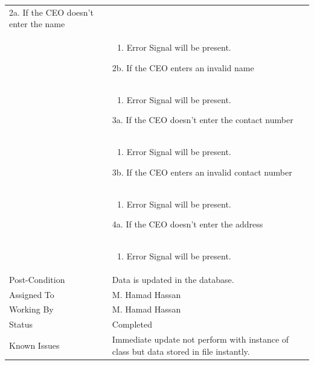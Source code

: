 \documentclass[12pt,a4paper]{article}
\begin{document}
\begin{longtable}{| p{3cm}|p{12cm}|}
2a.  If the CEO doesn't enter the name\\ 	
&	\begin{enumerate}
		\item Error Signal will be present.
	\end{enumerate}
2b. If the CEO enters an invalid name \\ 	
&	\begin{enumerate}
		\item Error Signal will be present.
	\end{enumerate}
3a.  If the CEO doesn't enter the contact number\\ 	
&	\begin{enumerate}
		\item Error Signal will be present.
	\end{enumerate}
3b. If the CEO enters an invalid contact number\\ 	
&	\begin{enumerate}
		\item Error Signal will be present.
	\end{enumerate}
4a.  If the CEO doesn't enter the address\\ 	
&	\begin{enumerate}
		\item Error Signal will be present.
	\end{enumerate}
\\ \hline
Post-Condition &  Data is updated in the database. \\\hline
Assigned To &  M. Hamad Hassan
\\ \hline
Working By &    M. Hamad Hassan
\\ \hline
Status & 	Completed	
\\ \hline
Known Issues &Immediate update not perform with instance of class but data stored in file instantly. 
\\\hline
\end{longtable}

\end{document}
